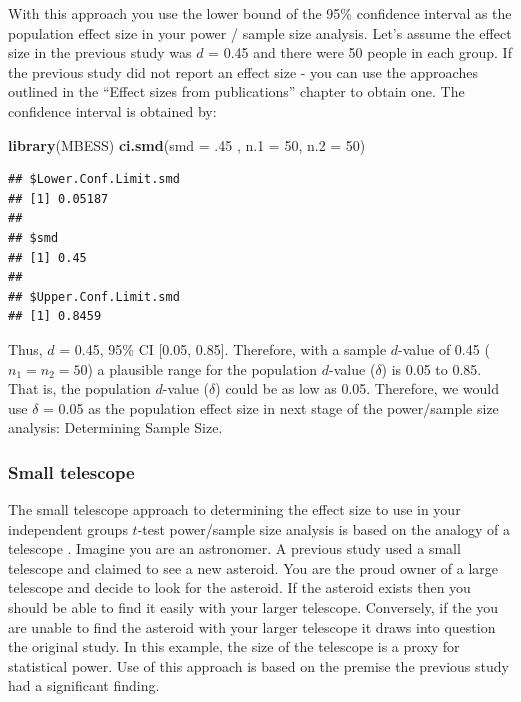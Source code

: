 \documentclass[
]{krantz}
\makeatletter
\newenvironment{Shaded}{\begin{snugshade}}{\end{snugshade}}
\newcommand{\DataTypeTok}[1]{\textcolor[rgb]{0.27,0.27,0.27}{#1}}
\newcommand{\DecValTok}[1]{\textcolor[rgb]{0.06,0.06,0.06}{#1}}
\newcommand{\FloatTok}[1]{\textcolor[rgb]{0.06,0.06,0.06}{#1}}
\newcommand{\KeywordTok}[1]{\textcolor[rgb]{0.27,0.27,0.27}{\textbf{#1}}}
\newcommand{\NormalTok}[1]{#1}
\newenvironment{kframe}{%
\medskip{}
\setlength{\fboxsep}{.8em}
 \def\at@end@of@kframe{}%
 \ifinner\ifhmode%
  \def\at@end@of@kframe{\end{minipage}}%
  \begin{minipage}{\columnwidth}%
 \fi\fi%
 \def\FrameCommand##1{\hskip\@totalleftmargin \hskip-\fboxsep
 \colorbox{shadecolor}{##1}\hskip-\fboxsep
     \hskip-\linewidth \hskip-\@totalleftmargin \hskip\columnwidth}%
 \MakeFramed {\advance\hsize-\width
   \@totalleftmargin\z@ \linewidth\hsize
   \@setminipage}}%
 {\par\unskip\endMakeFramed%
 \at@end@of@kframe}
\renewenvironment{Shaded}{\begin{kframe}}{\end{kframe}}
\makeatother
\begin{document}
With this approach you use the lower bound of the 95\% confidence interval as the population effect size in your power / sample size analysis. Let's assume the effect size in the previous study was \(d\) = 0.45 and there were 50 people in each group. If the previous study did not report an effect size - you can use the approaches outlined in the ``Effect sizes from publications'' chapter to obtain one. The confidence interval is obtained by:

\begin{Shaded}
\begin{Highlighting}[]
\KeywordTok{library}\NormalTok{(MBESS)}
\KeywordTok{ci.smd}\NormalTok{(}\DataTypeTok{smd =} \FloatTok{.45}\NormalTok{ , }\DataTypeTok{n.1 =} \DecValTok{50}\NormalTok{, }\DataTypeTok{n.2 =} \DecValTok{50}\NormalTok{) }
\end{Highlighting}
\end{Shaded}

\begin{verbatim}
## $Lower.Conf.Limit.smd
## [1] 0.05187
## 
## $smd
## [1] 0.45
## 
## $Upper.Conf.Limit.smd
## [1] 0.8459
\end{verbatim}

Thus, \(d\) = 0.45, 95\% CI {[}0.05, 0.85{]}. Therefore, with a sample \(d\)-value of 0.45 (\(n_1=n_2=50\)) a plausible range for the population \(d\)-value (\(\delta\)) is 0.05 to 0.85. That is, the population \(d\)-value (\(\delta\)) could be as low as 0.05. Therefore, we would use \(\delta\) = 0.05 as the population effect size in next stage of the power/sample size analysis: Determining Sample Size.

\hypertarget{small-telescope}{%
\subsubsection{Small telescope}\label{small-telescope}}

The small telescope approach to determining the effect size to use in your independent groups \(t\)-test power/sample size analysis is based on the analogy of a telescope \citep{simonsohn2015small}. Imagine you are an astronomer. A previous study used a small telescope and claimed to see a new asteroid. You are the proud owner of a large telescope and decide to look for the asteroid. If the asteroid exists then you should be able to find it easily with your larger telescope. Conversely, if the you are unable to find the asteroid with your larger telescope it draws into question the original study. In this example, the size of the telescope is a proxy for statistical power. Use of this approach is based on the premise the previous study had a significant finding.
\end{document}
